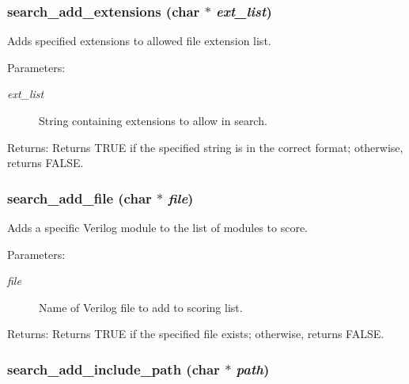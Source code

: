 \subsubsection{ search\_\-add\_\-extensions (char $\ast$ {\em ext\_\-list})}\label{search_8h_a5}


Adds specified extensions to allowed file extension list.

\begin{Desc}
\item[Parameters:]
\begin{description}
\item[{\em ext\_\-list}]String containing extensions to allow in search. \end{description}
\end{Desc}
\begin{Desc}
\item[Returns:]Returns TRUE if the specified string is in the correct format; otherwise, returns FALSE. \end{Desc}
\subsubsection{ search\_\-add\_\-file (char $\ast$ {\em file})}\label{search_8h_a3}


Adds a specific Verilog module to the list of modules to score.

\begin{Desc}
\item[Parameters:]
\begin{description}
\item[{\em file}]Name of Verilog file to add to scoring list. \end{description}
\end{Desc}
\begin{Desc}
\item[Returns:]Returns TRUE if the specified file exists; otherwise, returns FALSE. \end{Desc}
\subsubsection{ search\_\-add\_\-include\_\-path (char $\ast$ {\em path})}\label{search_8h_a1}



